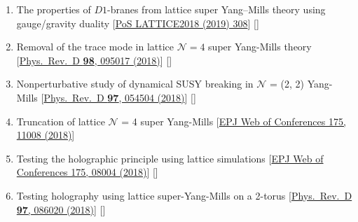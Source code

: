 \begin{enumerate}
  \item  The properties of $D1$-branes from lattice super Yang--Mills theory using gauge/gravity duality [\href{https://pos.sissa.it/334/308}{PoS LATTICE2018 (2019) 308}]   [\texttt{\textbf{}}] %
  \item  Removal of the trace mode in lattice $\mathcal{N }= 4$ super Yang-Mills theory [\href{https://journals.aps.org/prd/abstract/10.1103/PhysRevD.98.095017}{Phys.\ Rev.\ D {\bf 98}, 095017 (2018)}] [\texttt{\textbf{\texttt{}}}]  
 \item Nonperturbative study of dynamical SUSY breaking in $\mathcal{N}$ = (2, 2) Yang-Mills [\href{https://journals.aps.org/prd/abstract/10.1103/PhysRevD.97.054504}{Phys.\ Rev.\ D {\bf 97}, 054504 (2018)}] [\texttt{\textbf{}}]  
 \item Truncation of lattice $\mathcal{N}$ = 4 super Yang-Mills [\href{https://doi.org/10.1051/epjconf/201817511008}{EPJ Web of Conferences 175, 11008 (2018)}] %
\item Testing the holographic principle using lattice simulations  [\href{https://doi.org/10.1051/epjconf/201817508004}{EPJ Web of Conferences 175, 08004 (2018)}] [\texttt{\textbf{}}] %
\item Testing holography using lattice super-Yang-Mills on a 2-torus [\href{https://journals.aps.org/prd/abstract/10.1103/PhysRevD.97.086020}{Phys.\ Rev.\ D {\bf 97}, 086020 (2018)}] [\texttt{\textbf{}}]
\end{enumerate}
